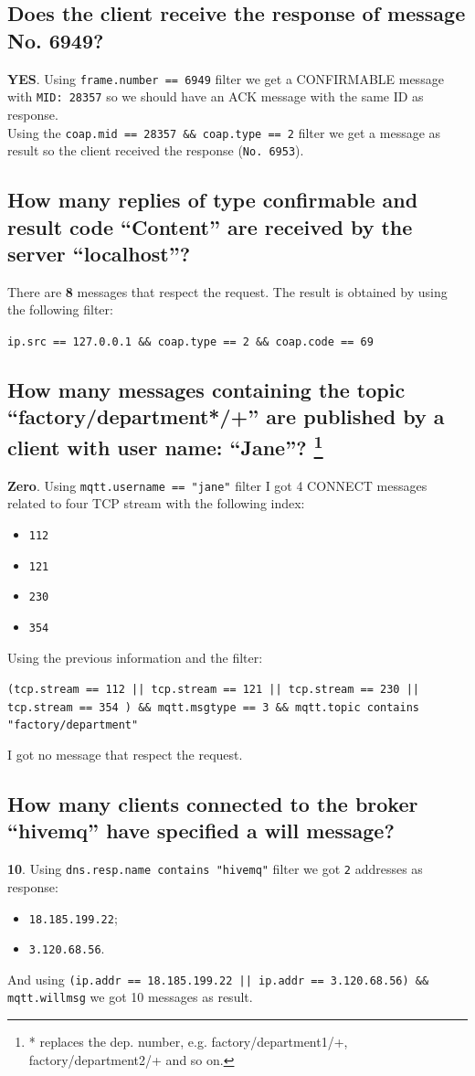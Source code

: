 \documentclass{article}
\begin{document}
		\subsection{Does the client receive the response of message No. 6949?} %
		\textbf{YES}. Using \texttt{frame.number == 6949} filter we get a CONFIRMABLE message with \texttt{MID: 28357} so we should have an ACK message with the same ID as response.\\
		Using the \texttt{coap.mid == 28357 \&\& coap.type == 2} filter we get a message as result so the client received the response (\texttt{No. 6953}).
		
		\subsection{How many replies of type confirmable and result code “Content” are received by the server “localhost”?} %
		There are \textbf{8} messages that respect the request. The result is obtained by using the following filter:
		\begin{center}
			\texttt{ip.src == 127.0.0.1 \&\& coap.type == 2 \&\& coap.code == 69}
		\end{center}
		
		\subsection{How many messages containing the topic “factory/department*/+” are published by a client with user name: “Jane”? \footnote{* replaces the dep. number, e.g. factory/department1/+, factory/department2/+ and so on.}} %
		\textbf{Zero}.
		Using \texttt{mqtt.username == "jane"} filter I got 4 CONNECT messages related to four TCP stream with the following index:
		\begin{itemize}
			\item \texttt{112}
			\item \texttt{121}
			\item \texttt{230}
			\item \texttt{354}
		\end{itemize}
		Using the previous information and the filter:
		\begin{center}
			\texttt{(tcp.stream == 112 || tcp.stream == 121 || tcp.stream == 230 || tcp.stream == 354 ) \&\& mqtt.msgtype == 3 \&\& mqtt.topic contains "factory/department"}
		\end{center}
		I got no message that respect the request.
		
		\subsection{How many clients connected to the broker “hivemq” have specified a will message?} %
		\textbf{10}. Using \texttt{dns.resp.name contains "hivemq"} filter we got \texttt{2} addresses as response:
		\begin{itemize}
			\item \texttt{18.185.199.22};
			\item \texttt{3.120.68.56}.
		\end{itemize}
		And using \texttt{(ip.addr == 18.185.199.22 || ip.addr == 3.120.68.56) \&\& mqtt.willmsg} we got 10 messages as result.
		
\end{document}
